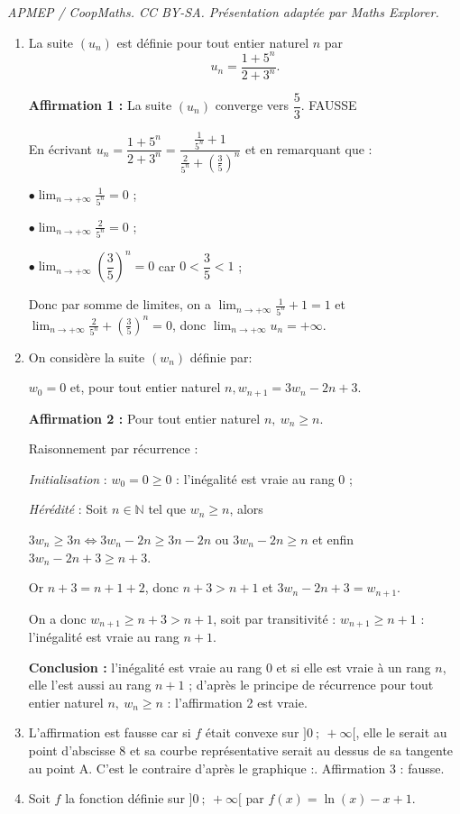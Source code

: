 \documentclass[10pt]{article}
\providecommand{\N}{\mathbb{N}}
\begin{document}
\noindent\textit{APMEP / CoopMaths. CC BY-SA. Présentation adaptée par Maths Explorer.}\par\medskip
\medskip

\begin{enumerate}
\item La suite $(u_n)$ est définie pour tout entier naturel $n$ par
\[u_n = \dfrac{1 + 5^n}{2 +3^n}.\]

\textbf{Affirmation 1 :} La suite $(u_n)$ converge vers $\dfrac 53$. FAUSSE

En écrivant $u_n = \dfrac{1 + 5^n}{2 +3^n} = \dfrac{\frac{1}{5^n} + 1}{\frac{2}{5^n} + \left(\frac 35 \right)^n}$ et en remarquant que :

$\bullet $$\displaystyle\lim_{n \to + \infty} \frac{1}{5^n} = 0$  ;

$\bullet $$\displaystyle\lim_{n \to + \infty} \frac{2}{5^n} = 0$  ;

$\bullet $$\displaystyle\lim_{n \to + \infty} \left(\dfrac 35 \right)^n = 0$ car $0 < \dfrac 35 < 1$ ;

Donc par somme de limites, on a $\displaystyle\lim_{n \to + \infty}\frac{1}{5^n} + 1 = 1$ et $\displaystyle\lim_{n \to + \infty}\frac{2}{5^n} + \left(\frac 35 \right)^n = 0$, donc $\displaystyle\lim_{n \to + \infty} u_n = + \infty$.
\item On considère la suite $(w_n)$ définie par:

\begin{center}$w_0 = 0$\: et, pour tout entier naturel\: $n, w_{n+1} = 3w_n - 2n + 3$.\end{center}

\textbf{Affirmation 2 :} Pour tout entier naturel $n,\: w_n \geqslant n$.

Raisonnement par récurrence :

\emph{Initialisation} : $w_0 = 0 \geqslant 0$  : l'inégalité est vraie au rang 0 ;

\emph{Hérédité} : Soit $n \in \N$ tel que $w_n \geqslant n$, alors 

$3w_n \geqslant 3n \iff 3w_n - 2n \geqslant 3n - 2n$ ou $3w_n - 2n \geqslant n$ et enfin $3w_n - 2n + 3 \geqslant n + 3$.

Or $n + 3 = n + 1 + 2$, donc $n + 3 > n + 1$ et $3w_n - 2n + 3 = w_{n+1}$.

On a donc $w_{n+1}\geqslant n + 3 > n + 1$, soit par transitivité : $w_{n+1}\geqslant n + 1$ : l'inégalité est vraie au rang $n + 1$.

\textbf{Conclusion :} l'inégalité est vraie au rang 0 et si elle est vraie à un rang $n$, elle l'est aussi au rang $n + 1$ ; d'après le principe de récurrence pour tout entier naturel $n,\: w_n \geqslant n$ : l'affirmation 2 est vraie.
\item L'affirmation est fausse car si $f$ était convexe sur $]0~;~+ \infty[$, elle le serait au point d'abscisse 8 et sa courbe représentative serait au dessus de sa tangente au  point A. C'est le contraire d'après le graphique :. Affirmation 3 : fausse.
\item Soit $f$ la fonction définie sur $]0~;~+ \infty[$ par $f(x) = \ln (x) - x + 1$.


\end{enumerate}
\end{document}
